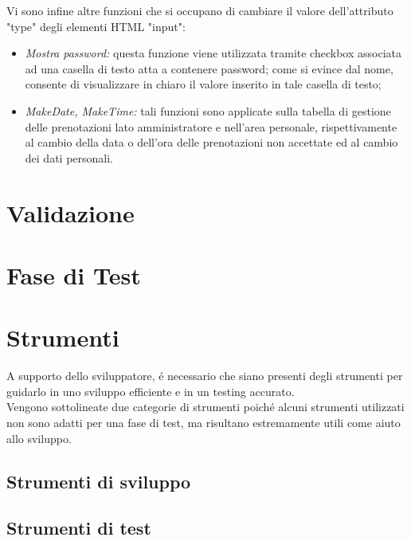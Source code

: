 \documentclass[]{article}
\begin{document}
Vi sono infine altre funzioni che si occupano di cambiare il valore dell'attributo "type" degli elementi HTML "input":
\begin{itemize}
        \item \textit{Mostra password:} questa funzione viene utilizzata tramite checkbox associata ad una casella di testo atta a contenere password; come si evince dal nome, consente di visualizzare in chiaro il valore inserito in tale casella di testo;
        \item \textit{MakeDate, MakeTime:} tali funzioni sono applicate sulla tabella di gestione delle prenotazioni lato amministratore e nell'area personale, rispettivamente al cambio della data o dell'ora delle prenotazioni non accettate ed al cambio dei dati personali.
\end{itemize}
 
\section{Validazione}

\section{Fase di Test}

\section{Strumenti}
A supporto dello sviluppatore, é necessario che siano presenti degli strumenti per guidarlo in uno sviluppo efficiente e in un testing accurato.\\
Vengono sottolineate due categorie di strumenti poiché alcuni strumenti utilizzati non sono adatti per una fase di test, ma risultano estremamente utili come aiuto allo sviluppo.
\subsection{Strumenti di sviluppo}
\subsection{Strumenti di test}
\end{document}
